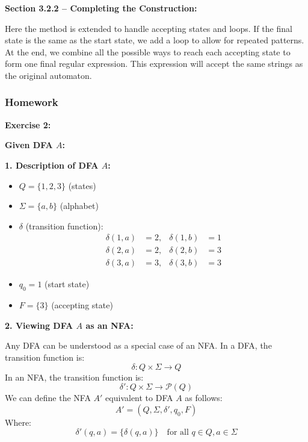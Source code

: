 \documentclass{article}
\theoremstyle{theorem}
\theoremstyle{definition}
\theoremstyle{remark}
\begin{document}
\textbf{Section 3.2.2 – Completing the Construction:}

Here the method is extended to handle accepting states and loops. If the final state is the same as the start state, we add a loop to allow for repeated patterns. At the end, we combine all the possible ways to reach each accepting state to form one final regular expression. This expression will accept the same strings as the original automaton.

\subsubsection{Homework}

\textbf{Exercise 2:}

\textbf{Given DFA $A$:}

\begin{center}
\end{center}

\textbf{1. Description of DFA $A$:}

\begin{itemize}
  \item $Q = \{1, 2, 3\}$ (states)
  \item $\Sigma = \{a, b\}$ (alphabet)
  \item $\delta$ (transition function):
  \[
  \begin{aligned}
  \delta(1, a) &= 2, &\delta(1, b) &= 1 \\
  \delta(2, a) &= 2, &\delta(2, b) &= 3 \\
  \delta(3, a) &= 3, &\delta(3, b) &= 3
  \end{aligned}
  \]
  \item $q_0 = 1$ (start state)
  \item $F = \{3\}$ (accepting state)
\end{itemize}

\textbf{2. Viewing DFA $A$ as an NFA:}

Any DFA can be understood as a special case of an NFA. In a DFA, the transition function is:
\[
\delta: Q \times \Sigma \rightarrow Q
\]
In an NFA, the transition function is:
\[
\delta': Q \times \Sigma \rightarrow \mathcal{P}(Q)
\]
We can define the NFA $A'$ equivalent to DFA $A$ as follows:
\[
A' = (Q, \Sigma, \delta', q_0, F)
\]
Where:
\[
\delta'(q, a) = \{\delta(q, a)\} \quad \text{for all } q \in Q, a \in \Sigma
\]
\end{document}
